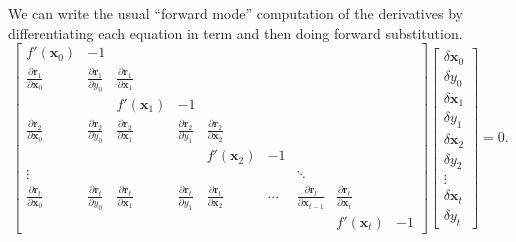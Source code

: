 \documentclass{article}
\newcommand{\bfx}{\mathbf{x}}
\newcommand{\bfr}{\mathbf{r}}
\begin{document}
We can write the usual ``forward mode'' computation of the derivatives
by differentiating each equation in term and then doing forward
substitution.
\[
\begin{bmatrix}
  f'(\bfx_0) & -1 \\
  \frac{\partial \bfr_1}{\partial \bfx_0} &
  \frac{\partial \bfr_1}{\partial y_0} &
  \frac{\partial \bfr_1}{\partial \bfx_1} \\
    &   & f'(\bfx_1) & -1 \\
  \frac{\partial \bfr_2}{\partial \bfx_0} &
  \frac{\partial \bfr_2}{\partial y_0} &
  \frac{\partial \bfr_2}{\partial \bfx_1} &
  \frac{\partial \bfr_2}{\partial y_1} &
  \frac{\partial \bfr_2}{\partial \bfx_2} \\
  &   &   &   & f'(\bfx_2) & -1 \\
  \vdots & & & & & & \ddots \\
  \frac{\partial \bfr_t}{\partial \bfx_0} &
  \frac{\partial \bfr_t}{\partial y_0} &
  \frac{\partial \bfr_t}{\partial \bfx_1} &
  \frac{\partial \bfr_t}{\partial y_1} &
  \frac{\partial \bfr_t}{\partial \bfx_2} &
  \cdots &
  \frac{\partial \bfr_t}{\partial \bfx_{t-1}} &
  \frac{\partial \bfr_t}{\partial \bfx_t} \\
  &   &   &   & & & & f'(\bfx_t) & -1 
\end{bmatrix}
\begin{bmatrix}
  \delta \bfx_0 \\ \delta y_0 \\
  \delta \bfx_1 \\ \delta y_1 \\
  \delta \bfx_2 \\ \delta y_2 \\
  \vdots \\
  \delta \bfx_t \\ \delta y_t
\end{bmatrix} = 0.
\]
\end{document}
